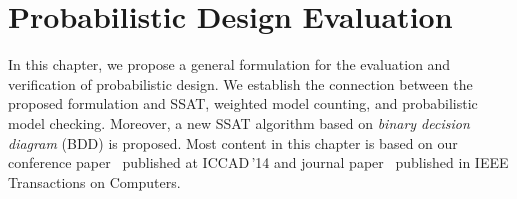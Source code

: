 \chapter{Probabilistic Design Evaluation}
\label{chap:prob-design-eval}

In this chapter, we propose a general formulation for the evaluation and verification of probabilistic design.
We establish the connection between the proposed formulation and SSAT, weighted model counting, and probabilistic model checking.
Moreover, a new SSAT algorithm based on \textit{binary decision diagram} (BDD) is proposed.
Most content in this chapter is based on our conference paper~\cite{LeeICCAD14ProbDesign} published at ICCAD\,'14 and journal paper~\cite{LeeTC18ProbDesign} published in IEEE Transactions on Computers.





